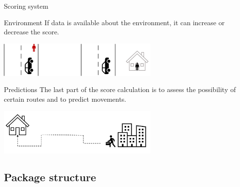 \documentclass{beamer}
\begin{document}
\begin{frame}{Scoring system}
        \begin{block}{Environment}
            If data is available about the environment, it can increase or decrease the score.
        \end{block}
        \vspace{0.1cm}
        \centering
        \includegraphics[width=0.6\textwidth]{pics/environment}
        \vspace{0.5cm}
        \begin{block}{Predictions}
            The last part of the score calculation is to assess the possibility of certain routes and to predict movements.
        \end{block}
        \centering
        \includegraphics[width=0.6\textwidth]{pics/route_prediction}

\end{frame}

\subsection{Package structure}
\end{document}
